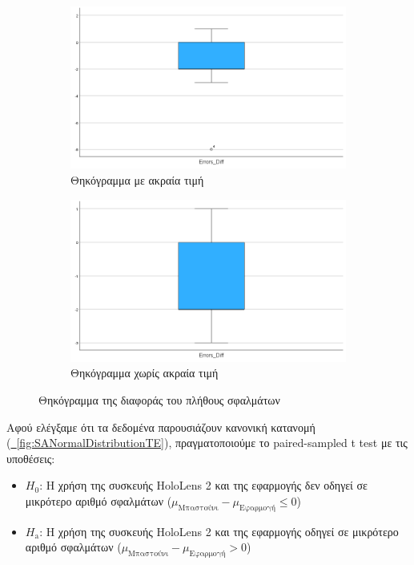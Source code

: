 \begin{figure}[!h]
    \centering
    \begin{subfigure}{0.5\textwidth}
        \centering
        \includegraphics[width=0.9\linewidth]{images/SA_Boxplot_TotalErrorsDiff.png}
        \caption{Θηκόγραμμα με ακραία τιμή}\label{fig:SABoxplotTEDiffWithOutliers}
    \end{subfigure}%
    \begin{subfigure}{0.5\textwidth}
        \centering
        \includegraphics[width=0.9\linewidth]{images/SA_Boxplot_Without_Outliers_TotalErrorsDiff.png}
        \caption{Θηκόγραμμα χωρίς ακραία τιμή}\label{fig:SABoxplotTEDiffWithoutOutliers}
    \end{subfigure}%
    \caption{Θηκόγραμμα της διαφοράς του πλήθους σφαλμάτων}\label{fig:SABoxplotTEDiff}
\end{figure}

Αφού ελέγξαμε ότι τα δεδομένα παρουσιάζουν κανονική κατανομή (\hyperref[fig:SANormalDistributionTE]{\schema~\ref*{fig:SANormalDistributionTE}}), πραγματοποιούμε το paired-sampled t test με τις υποθέσεις:
\begin{itemize}
    \item \textbf{$H_0$}: Η χρήση της συσκευής HoloLens 2 και της εφαρμογής δεν οδηγεί σε μικρότερο αριθμό σφαλμάτων ($\mu_{\text{Μπαστούνι}} - \mu_{\text{Εφαρμογή}} \le 0$)
    \item \textbf{$H_{\text{a}}$}: Η χρήση της συσκευής HoloLens 2 και της εφαρμογής οδηγεί σε μικρότερο αριθμό σφαλμάτων ($\mu_{\text{Μπαστούνι}} - \mu_{\text{Εφαρμογή}} > 0$)
\end{itemize}

